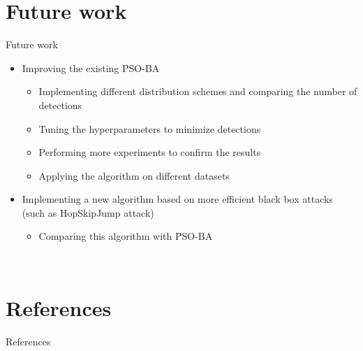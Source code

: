 \documentclass[11pt,t]{beamer}
\begin{document}
\section{Future work}
\begin{frame}{Future work}
\begin{itemize}
	\item Improving the existing PSO-BA
	\begin{itemize}
		\item Implementing different distribution schemes and comparing the number of detections
		\item Tuning the hyperparameters to minimize detections
		\item Performing more experiments to confirm the results
		\item Applying the algorithm on different datasets
	\end{itemize}
	\item Implementing a new algorithm based on more efficient black box attacks (such as HopSkipJump attack)
	\begin{itemize}
		\item Comparing this algorithm with PSO-BA
	\end{itemize}
\end{itemize}
\end{frame}

\begin{frame}

\centering
\textcolor{white}{Questions?}
\end{frame}

\appendix
\section*{References}
\begin{frame}[allowframebreaks]{References}


\end{frame}
\end{document}
